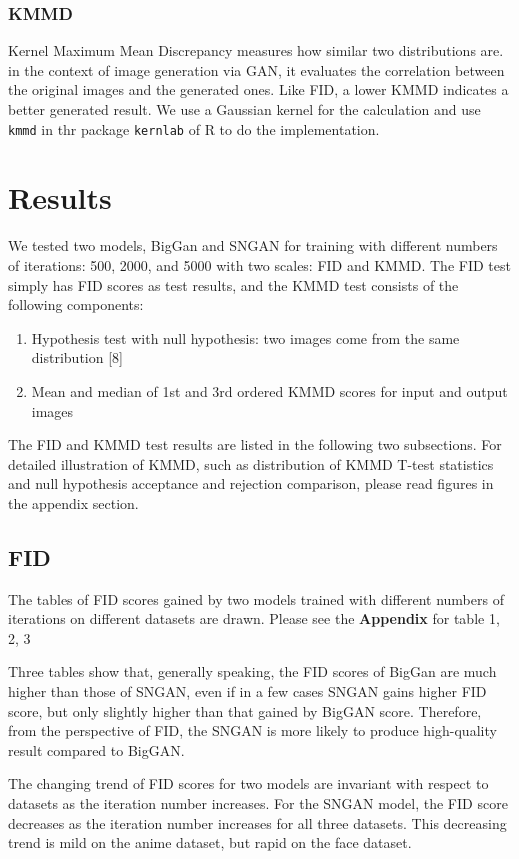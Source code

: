 \documentclass{article}
\begin{document}
    \subsubsection{KMMD}
    Kernel Maximum Mean Discrepancy measures how similar two distributions are. in the context of image generation via GAN, it evaluates the correlation between the original images and the generated ones. Like FID, a lower KMMD indicates a better generated result. We use a Gaussian kernel for the calculation and use \texttt{kmmd} in thr package \texttt{kernlab} of R to do the implementation.
    

\section{Results}
We tested two models, BigGan and SNGAN for training with different numbers of iterations: 500, 2000, and 5000 with two scales: FID and KMMD. The FID test simply has FID scores as test results, and the KMMD test consists of the following components:
\begin{enumerate}
    \setlength\itemsep{0.01mm}
    \item Hypothesis test with null hypothesis: two images come from the same distribution [8]
    \item Mean and median of 1st and 3rd ordered KMMD scores for input and output images
\end{enumerate}
The FID and KMMD test results are listed in the following two subsections. For detailed illustration of KMMD, such as distribution of KMMD T-test statistics and null hypothesis acceptance and rejection comparison, please read figures in the appendix section.
\subsection{FID}
The tables of FID scores gained by two models trained with different numbers of iterations on different datasets are drawn. Please see the \textbf{Appendix} for table 1, 2, 3


Three tables show that, generally speaking, the FID scores of BigGan are much higher than those of SNGAN, even if in a few cases SNGAN gains higher FID score, but only slightly higher than that gained by BigGAN score. Therefore, from the perspective of FID, the SNGAN is more likely to produce high-quality result compared to BigGAN.

The changing trend of FID scores for two models are invariant with respect to datasets as the iteration number increases. For the SNGAN model, the FID score decreases as the iteration number increases for all three datasets. This decreasing trend is mild on the anime dataset, but rapid on the face dataset.
\end{document}
